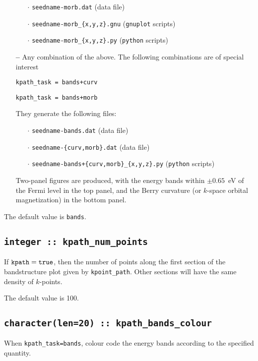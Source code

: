 \begin{itemize}
\begin{itemize}
   \item[$\cdot$] {\tt seedname-morb.dat} (data file)

   \item[$\cdot$] {\tt seedname-morb\_\{x,y,z\}.gnu} ({\tt gnuplot}
     scripts)

   \item[$\cdot$] {\tt seedname-morb\_\{x,y,z\}.py} ({\tt python}
     scripts)

\end{itemize}

\item[{\bf --}] Any combination of the above.  The following
  combinations are of special interest

{\tt kpath\_task = bands+curv}

{\tt kpath\_task = bands+morb}

They generate the following files:
\begin{itemize}
  
   \item[$\cdot$] {\tt seedname-bands.dat} (data file) 

   \item[$\cdot$] {\tt seedname-\{curv,morb\}.dat} (data file) 

   \item[$\cdot$] {\tt seedname-bands+\{curv,morb\}\_\{x,y,z\}.py}
     ({\tt python} scripts)

\end{itemize}

Two-panel figures are produced, with the energy bands within $\pm
0.65$~eV of the Fermi level in the top panel, and the Berry curvature
(or $k$-space orbital magnetization) in the bottom panel.
\end{itemize}

The default value is {\tt bands}.


\subsection[kpath\_num\_points]{\tt integer :: kpath\_num\_points}

If $\verb#kpath#=\verb#true#$, then the number of points along
the first section of the bandstructure plot given by
\verb#kpoint_path#. Other sections will have the same density of
$k$-points. 

The default value is 100.


\subsection[kpath\_colour]{\tt character(len=20) ::
  kpath\_bands\_colour}
When {\tt kpath\_task=bands}, colour code the energy bands according
to the specified quantity.

